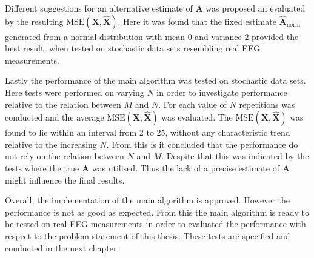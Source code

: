 Different suggestions for an alternative estimate of $\mathbf{A}$ was proposed an evaluated by the resulting $\text{MSE}(\mathbf{X}, \hat{\mathbf{X}})$. 
Here it was found that the fixed estimate $\hat{\mathbf{A}}_{\text{norm}}$ generated from a normal distribution with mean $0$ and variance $2$ provided the best result, when tested on stochastic data sets resembling real EEG measurements.          
      
Lastly the performance of the main algorithm was tested on stochastic data sets. 
Here tests were performed on varying $N$ in order to investigate performance relative to the relation between $M$ and $N$. 
For each value of $N$ repetitions was conducted and the average $\text{MSE}(\mathbf{X}, \hat{\mathbf{X}})$ was evaluated. 
The $\text{MSE}(\mathbf{X}, \hat{\mathbf{X}})$ was found to lie within an interval from 2 to 25, without any characteristic trend relative to the increasing $N$. 
From this is it concluded that the performance do not rely on the relation between $N$ and $M$. 
Despite that this was indicated by the tests where the true $\mathbf{A}$ was utilised. 
Thus the lack of a precise estimate of $\mathbf{A}$ might influence the final results. 

Overall, the implementation of the main algorithm is approved. 
However the performance is not as good as expected. 
From this the main algorithm is ready to be tested on real EEG measurements in order to evaluated the performance with respect to the problem statement of this thesis. These tests are specified and conducted in the next chapter.           


